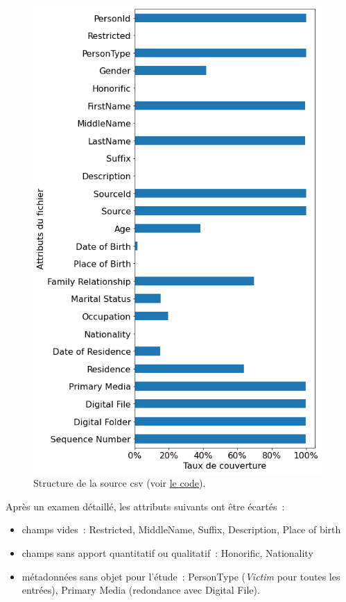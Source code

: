 \documentclass[a4paper,12pt,twoside]{book}
\begin{document}
    			    \begin{figure}[!ht]
            			\centering
                        \includegraphics[width=11cm]{images/ushmm_content.png}
                        \vspace{-0.5em}
                        \caption{Structure de la source \acrshort{csv} (voir \hyperref[analyse1]{le code}).}
                        \label{fig10}
                    \end{figure}
    
    			    \pagebreak
    			    
    			    Après un examen détaillé, les attributs suivants ont être écartés~:
    			    
    			    \begin{itemize}
    			        \item champs vides~: Restricted, MiddleName, Suffix, Description, Place of birth
    			        \item champs sans apport quantitatif ou qualitatif~: Honorific, Nationality
    			        \item métadonnées sans objet pour l'étude~: PersonType (\og{}\textit{Victim}\fg{} pour toutes les entrées), Primary Media (redondance avec Digital File).
    			    \end{itemize}
                    \vspace{-0.8em}
\end{document}
